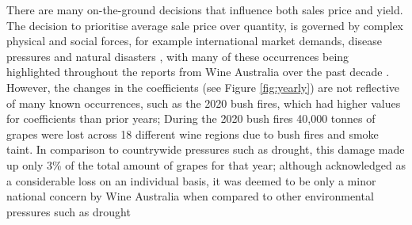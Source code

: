 \documentclass[review,12pt,authoryear]{elsarticle}
\begin{document}
\begin{linenumbers}
There are many on-the-ground decisions that influence both sales price and yield. The decision to prioritise average sale price over quantity, is governed by complex physical and social forces, for example international market demands, disease pressures and natural disasters \citep{abadCoverCropsViticulture2021,cortezUsingDataMining2009,hallWithinseasonTemporalVariation2011,i.goodwinManagingSoilWater2009,kasimatiPredictingGrapeSugar2022,oliverReviewSoilPhysical2013,srivastavaNondestructiveSensingMethods2018}, with many of these occurrences being highlighted throughout the reports from Wine Australia over the past decade \citep{wineaustraliaNationalVintageReport2019,wineaustraliaNationalVintageReport2021,wineaustraliaNationalVintageReport2022,winemakersfederationofaustraliaNationalVintageReport2013,winemakersfederationofaustraliaNationalVintageReport2014,winemakersfederationofaustraliaNationalVintageReport2015,winemakersfederationofaustraliaNationalVintageReport2016,winemakersfederationofaustraliaNationalVintageReport2017,winemakersfederationofaustraliaNationalVintageReport2018}. However, the changes in the coefficients (see Figure \ref{fig:yearly}) are not reflective of many known occurrences, such as the 2020 bush fires, which had higher values for coefficients than prior years; During the 2020 bush fires 40,000 tonnes of grapes were lost across 18 different wine regions due to bush fires and smoke taint. In comparison to countrywide pressures such as drought, this damage made up only 3\% of the total amount of grapes for that year; although acknowledged as a considerable loss on an individual basis, it was deemed to be only a minor national concern by Wine Australia when compared to other environmental pressures such as drought \citep{wineaustraliaNationalVintageReport2020}
\par

\end{linenumbers}
\end{document}

